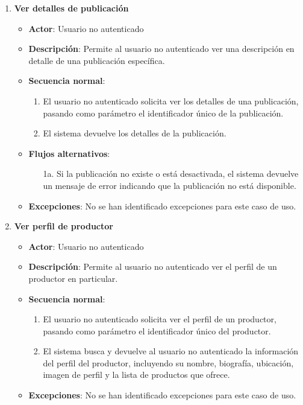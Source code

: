 \begin{enumerate}[label=UC-\protect\twodigits{\arabic*}:, align=left, leftmargin=*]
\item \textbf{Ver detalles de publicación}
\begin{itemize}
\item \textbf{Actor}: Usuario no autenticado
\item \textbf{Descripción}: Permite al usuario no autenticado ver una descripción en detalle de una publicación específica.
\item \textbf{Secuencia normal}:
\begin{enumerate}[label={\arabic*}:]
\item El usuario no autenticado solicita ver los detalles de una publicación, pasando como parámetro el identificador único de la publicación.
\item El sistema devuelve los detalles de la publicación.
\end{enumerate}
\item \textbf{Flujos alternativos}:
\begin{itemize}
\item[1a.] Si la publicación no existe o está desactivada, el sistema devuelve un mensaje de error indicando que la publicación no está disponible.
\end{itemize}
\item \textbf{Excepciones}: No se han identificado excepciones para este caso de uso.
\end{itemize}

\item \textbf{Ver perfil de productor}
\begin{itemize}
\item \textbf{Actor}: Usuario no autenticado
\item \textbf{Descripción}: Permite al usuario no autenticado ver el perfil de un productor en particular.
\item \textbf{Secuencia normal}:
\begin{enumerate}[label={\arabic*}:]
\item El usuario no autenticado solicita ver el perfil de un productor, pasando como parámetro el identificador único del productor.
\item El sistema busca y devuelve al usuario no autenticado la información del perfil del productor, incluyendo su nombre, biografía, ubicación, imagen de perfil y la lista de productos que ofrece.
\end{enumerate}
\item \textbf{Excepciones}: No se han identificado excepciones para este caso de uso.
\end{itemize}



\end{enumerate}
